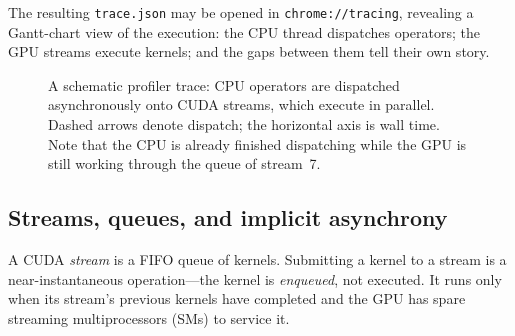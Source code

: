 \documentclass[11pt,a4paper]{article}
\theoremstyle{definition}
\theoremstyle{remark}
\newcommand{\code}[1]{\texttt{\small #1}}
\begin{document}
The resulting \texttt{trace.json} may be opened in \code{chrome://tracing}, revealing a Gantt-chart view of the execution: the CPU thread dispatches operators; the GPU streams execute kernels; and the gaps between them tell their own story.

\begin{figure}[ht]
\centering
{}
\caption{A schematic profiler trace: CPU operators are dispatched asynchronously onto CUDA streams, which execute in parallel. Dashed arrows denote dispatch; the horizontal axis is wall time. Note that the CPU is already finished dispatching while the GPU is still working through the queue of stream~7.}
\label{fig:profiler}
\end{figure}

\subsection{Streams, queues, and implicit asynchrony}

A CUDA \emph{stream} is a FIFO queue of kernels. Submitting a kernel to a stream is a near-instantaneous operation---the kernel is \emph{enqueued}, not executed. It runs only when its stream's previous kernels have completed and the GPU has spare streaming multiprocessors (SMs) to service it.
\end{document}
